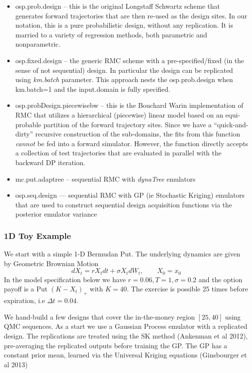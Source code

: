 \documentclass[]{article}
\begin{document}
\begin{itemize}
\item
  osp.prob.design -- this is the original Longstaff Schwartz scheme that
  generates forward trajectories that are then re-used as the design
  sites. In our notation, this is a pure probabilistic design, without
  any replication. It is married to a variety of regression methods,
  both parametric and nonparametric.
\item
  osp.fixed.design -- the generic RMC scheme with a pre-specified/fixed
  (in the sense of not sequential) design. In particular the design can
  be replicated using \emph{km.batch} parameter. This approach nests the
  osp.prob.design when km.batch=1 and the input.domain is fully
  specified.
\item
  osp.probDesign.piecewisebw -- this is the Bouchard Warin
  implementation of RMC that utilizes a hierarchical (piecewise) linear
  model based on an equi-probable partition of the forward trajectory
  sites. Since we have a ``quick-and-dirty'' recursive construction of
  the sub-domains, the fits from this function \emph{cannot} be fed into
  a forward simulator. However, the function directly accepts a
  collection of test trajectories that are evaluated in parallel with
  the backward DP iteration.
\item
  mc.put.adaptree -- sequential RMC with \emph{dynaTree} emulators
\item
  osp.seq.design --- sequential RMC with GP (ie Stochastic Kriging)
  emulators that are used to construct sequential design acquisition
  functions via the posterior emulator variance
\end{itemize}

\subsubsection{1D Toy Example}\label{d-toy-example}

We start with a simple 1-D Bermudan Put. The underlying dynamics are
given by Geometric Brownian Motion
\[ dX_t = rX_t dt + \sigma X_t dW_t, \qquad X_0 = x_0\] In the model
specification below we have \(r=0.06, T=1, \sigma=0.2\) and the option
payoff is a Put \((K-X_t)_+\) with \(K=40\). The exercise is possible 25
times before expiration, i.e \(\Delta t = 0.04\).

We hand-build a few designs that cover the in-the-money region
\([25,40]\) using QMC sequences. As a start we use a Gaussian Process
emulator with a replicated design. The replications are treated using
the SK method (Ankenman et al 2012), pre-averaging the replicated
outputs before training the GP. The GP has a constant prior mean,
learned via the Universal Kriging equations (Ginsbourger et al 2013)
\end{document}
